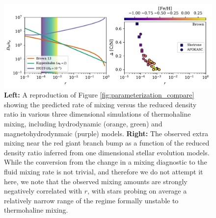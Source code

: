 \begin{figure}[!tb]
\begin{center}
\includegraphics[width=\textwidth]{./figures/punchline/punchline.pdf}
\caption{\textbf{Left:} A reproduction of Figure \ref{fig:parameterization_compare} showing the predicted rate of mixing versus the reduced density ratio in various three dimensional simulations of thermohaline mixing, including hydrodynamic (orange, green) and magnetohydrodynmaic (purple) models. \textbf{Right:} The observed extra mixing near the red giant branch bump as a function of the reduced density ratio inferred from one dimensional stellar evolution models. While the conversion from the change in a mixing diagnostic to the fluid mixing rate is not trivial, and therefore we do not attempt it here, we note that the observed mixing amounts are strongly negatively correlated with $r$, with stars probing on average a relatively narrow range of the regime formally unstable to thermohaline mixing. }
\label{Fig:compare}
\end{center}
\end{figure}


